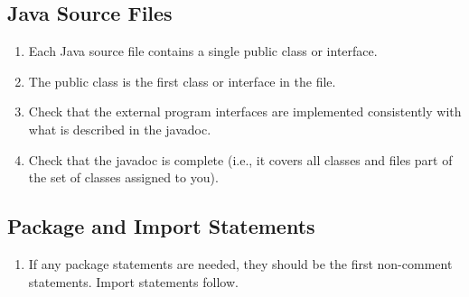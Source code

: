 \documentclass[a4paper,11pt]{report} %
\begin{document}
		\subsection*{Java Source Files}\begin{enumerate}[resume]
			\item Each Java source file contains a single public class or interface.
			\item The public class is the first class or interface in the file.
			\item Check that the external program interfaces are implemented consistently with what is described in the javadoc.
			\item Check that the javadoc is complete (i.e., it covers all classes and files part of the set of classes assigned to you).
		\end{enumerate}
		
		\subsection*{Package and Import Statements}\begin{enumerate}[resume]
			\item If any package statements are needed, they should be the first non-comment statements. Import statements follow.
		\end{enumerate}
		
\end{document}
